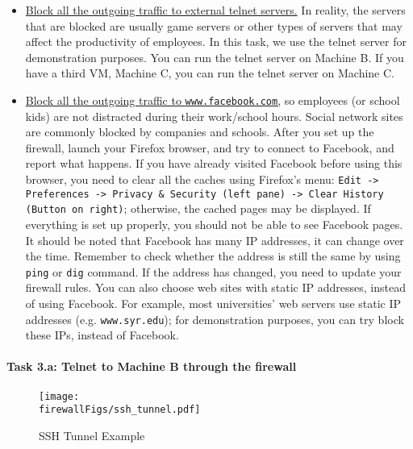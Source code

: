\begin{itemize}
\item \underline{Block all the outgoing traffic to external telnet servers.}  In
reality, the servers that are blocked are usually game servers or other
types of servers that may affect the productivity of employees. In this 
task, we use the telnet server for demonstration purposes. You can run
the telnet server on Machine B.
If you have a third VM, Machine C, you can run the 
telnet server on Machine C. 


\item \underline{Block all the outgoing traffic to {\tt www.facebook.com},} so employees 
(or school kids) are not distracted during their work/school hours. Social
network sites are commonly blocked by companies and schools. After 
you set up the firewall, launch your Firefox browser, and try to connect to Facebook, and report
what happens. If you have already visited Facebook before using this 
browser, you need to clear all the caches using 
Firefox's menu: 
\texttt{Edit -> Preferences -> Privacy \& Security (left pane) -> Clear History (Button on right)}; 
otherwise, the cached
pages may be displayed. If everything is set up properly, you 
should not be able to see Facebook pages. 
It should be noted that Facebook has many IP addresses, it can 
change over the time. Remember to check whether the address is 
still the same by using {\tt ping} or {\tt dig} command. If 
the address has changed, you need to update your firewall rules. 
You can also choose web sites with static IP addresses, instead of using Facebook.
For example, most universities' web servers use static IP addresses (e.g. 
{\tt www.syr.edu}); for demonstration purposes, 
you can try block these IPs, instead of Facebook. 

\end{itemize}



\paragraph{Task 3.a: Telnet to Machine B through the firewall}


\begin{figure}[htb]
\begin{center}
\texttt{[image: \\firewallFigs/ssh\_tunnel.pdf]}
\end{center}
\caption{SSH Tunnel Example}
\label{firewall:fig:sshtunnel}
\end{figure}
 
